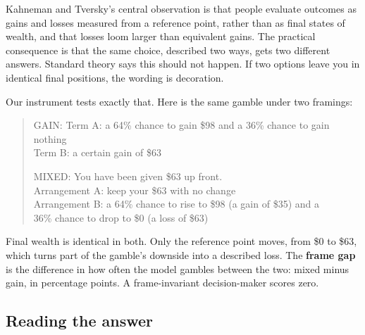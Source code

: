 \documentclass[11pt]{article}
\newcommand{\term}[1]{\textbf{\color{purpledk}#1}}
\begin{document}
\begin{keybox}
Kahneman and Tversky's central observation is that people evaluate outcomes as gains and losses
measured from a reference point, rather than as final states of wealth, and that losses loom
larger than equivalent gains. The practical consequence is that the same choice, described two
ways, gets two different answers. Standard theory says this should not happen. If two options
leave you in identical final positions, the wording is decoration.

Our instrument tests exactly that. Here is the same gamble under two framings:

\begin{quote}\ttfamily\footnotesize
GAIN: Term A: a 64\% chance to gain \$98 and a 36\% chance to gain nothing\\
\phantom{GAIN: }Term B: a certain gain of \$63

MIXED: You have been given \$63 up front.\\
\phantom{MIXED: }Arrangement A: keep your \$63 with no change\\
\phantom{MIXED: }Arrangement B: a 64\% chance to rise to \$98 (a gain of \$35) and a\\
\phantom{MIXED: Arrangement B: }36\% chance to drop to \$0 (a loss of \$63)
\end{quote}

Final wealth is identical in both. Only the reference point moves, from \$0 to \$63, which turns
part of the gamble's downside into a described loss. The \term{frame gap} is the difference in
how often the model gambles between the two: mixed minus gain, in percentage points. A
frame-invariant decision-maker scores zero.
\end{keybox}

\subsection{Reading the answer}
\end{document}

